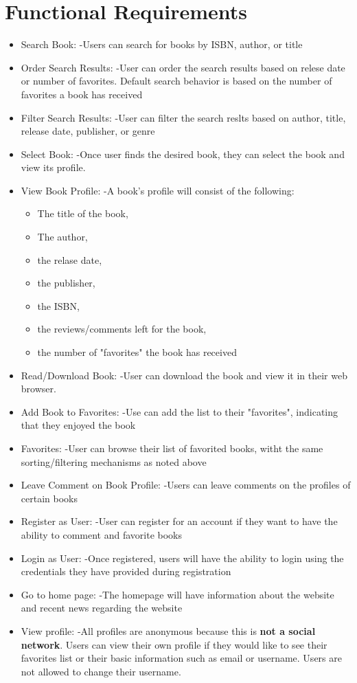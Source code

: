 \documentclass[letter, 12pt, titlepage]{article}
\begin{document}
\section{Functional Requirements}
	\begin{itemize}

	\item	Search Book:
			-Users can search for books by ISBN, author, or title
	\item	Order Search Results:
			-User can order the search results based on relese date or number of favorites. Default search behavior is based on the number of favorites a book has received

	\item	Filter Search Results:
			-User can filter the search reslts based on author, title, release date, publisher, or genre
	\item	Select Book:
			-Once user finds the desired book, they can select the book and view its profile.
	\item	View Book Profile:
			-A book's profile will consist of the following:
			\begin{itemize}
				\item The title of the book,
				\item The author,
				\item the relase date,
				\item the publisher,
				\item the ISBN,
				\item the reviews/comments left for the book,
				\item the number of "favorites" the book has received
			\end{itemize}

	\item Read/Download Book:
		-User can download the book and view it in their web browser.
	\item Add Book to Favorites:
		-Use can add the list to their "favorites", indicating that they enjoyed the book
	\item Favorites:
		-User can browse their list of favorited books, witht the same sorting/filtering mechanisms as noted above
	\item Leave Comment on Book Profile:
		-Users can leave comments on the profiles of certain books
	\item Register as User:
		-User can register for an account if they want to have the ability to comment and favorite books
	\item Login as User:
		-Once registered, users will have the ability to login using the credentials they have provided during registration
	\item Go to home page:
		-The homepage will have information about the website and recent news regarding the website
	\item View profile:
		-All profiles are anonymous because this is \textbf{not a social network}. Users can view their own profile if they would like to see their favorites list or their basic information such as email or username. Users are not allowed to change their username.


\end{itemize}
\end{document}
